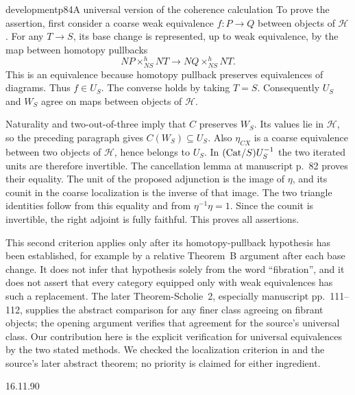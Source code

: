 \begin{dcomment}{development}{p84}{A universal version of the coherence calculation}
To prove the assertion, first consider a coarse weak equivalence $f:P\to Q$ between objects of $\mathcal H$. For any $T\to S$, its base change is represented, up to weak equivalence, by the map between homotopy pullbacks
\[
 NP\mathbin{\times^{h}_{NS}}NT
   \longrightarrow NQ\mathbin{\times^{h}_{NS}}NT.
\]
This is an equivalence because homotopy pullback preserves equivalences of diagrams. Thus $f\in U_S$. The converse holds by taking $T=S$. Consequently $U_S$ and $W_S$ agree on maps between objects of $\mathcal H$.

Naturality and two-out-of-three imply that $C$ preserves $W_S$. Its values lie in $\mathcal H$, so the preceding paragraph gives $C(W_S)\subseteq U_S$. Also $\eta_{CX}$ is a coarse equivalence between two objects of $\mathcal H$, hence belongs to $U_S$. In $(\mathrm{Cat}/S)U_S^{-1}$ the two iterated units are therefore invertible. The cancellation lemma at manuscript p.~82 proves their equality. The unit of the proposed adjunction is the image of $\eta$, and its counit in the coarse localization is the inverse of that image. The two triangle identities follow from this equality and from $\eta^{-1}\eta=1$. Since the counit is invertible, the right adjoint is fully faithful. This proves all assertions.

This second criterion applies only after its homotopy-pullback hypothesis has been established, for example by a relative Theorem~B argument after each base change. It does not infer that hypothesis solely from the word ``fibration'', and it does not assert that every category equipped only with weak equivalences has such a replacement. The later Theorem-Scholie~2, especially manuscript pp.~111--112, supplies the abstract comparison for any finer class agreeing on fibrant objects; the opening argument verifies that agreement for the source's universal class. Our contribution here is the explicit verification for universal equivalences by the two stated methods. We checked the localization criterion in \citet[Proposition~5.2.7.4]{Lurie2009HTT} and the source's later abstract theorem; no priority is claimed for either ingredient.
\end{dcomment}



\begin{flushright}
16.11.90
\end{flushright}

